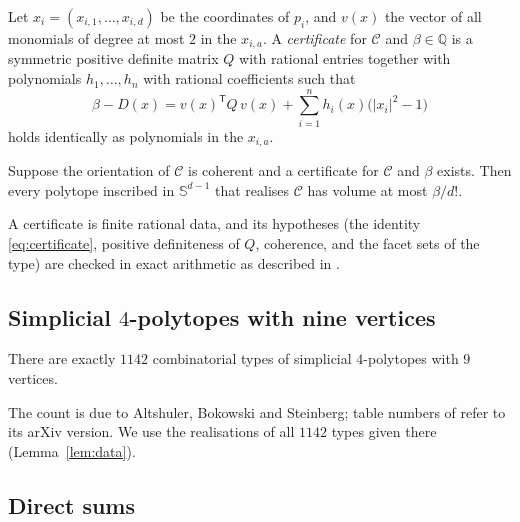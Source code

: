 \begin{definition}
  \label{def:certificate}
  Let $x_{i} = (x_{i,1}, \ldots, x_{i,d})$ be the coordinates of $p_{i}$, and
  $v(x)$ the vector of all monomials of degree at most $2$ in the $x_{i,a}$. A
  \emph{certificate} for $\mathcal{C}$ and $\beta \in \mathbb{Q}$ is a
  symmetric positive definite matrix $Q$ with rational entries together with
  polynomials $h_{1}, \ldots, h_{n}$ with rational coefficients such that
  \begin{equation}
    \label{eq:certificate}
    \beta - D(x) = v(x)^{\mathsf{T}} Q\, v(x)
      + \sum_{i=1}^{n} h_{i}(x)\bigl(|x_{i}|^{2} - 1\bigr)
  \end{equation}
  holds identically as polynomials in the $x_{i,a}$.
\end{definition}

\begin{proposition}
  \label{prop:certificate}
  Suppose the orientation of $\mathcal{C}$ is coherent and a certificate for
  $\mathcal{C}$ and $\beta$ exists. Then every polytope inscribed in
  $\mathbb{S}^{d-1}$ that realises $\mathcal{C}$ has volume at most
  $\beta/d!$.
\end{proposition}

A certificate is finite rational data, and its hypotheses (the identity
\eqref{eq:certificate}, positive definiteness of $Q$, coherence, and the facet
sets of the type) are checked in exact arithmetic as described in
\cite[Section~3.3]{medgyes-maxvol-d4}.

\subsection{Simplicial \texorpdfstring{$4$}{4}-polytopes with nine vertices}

\begin{theorem}
  \label{thm:count}
  There are exactly $1142$ combinatorial types of simplicial $4$-polytopes with
  $9$ vertices.
\end{theorem}

The count is due to Altshuler, Bokowski and Steinberg; table numbers of
\cite{firsching-2017} refer to its arXiv version.
We use the realisations of all $1142$ types given there (Lemma~\ref{lem:data}).

\subsection{Direct sums}

